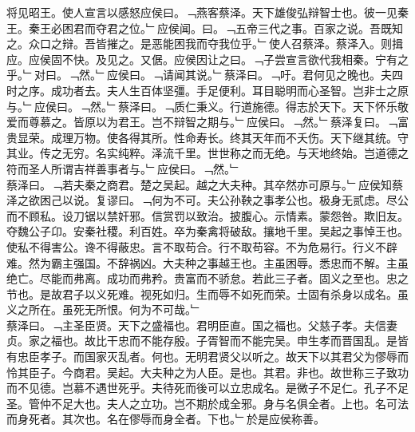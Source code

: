 \documentclass{zhvt-classic}
\begin{document}
\hspace*{2em}将见昭王。使人宣言以感怒应侯曰。﹁燕客蔡泽。天下雄俊弘辩智士也。彼一见秦王。秦王必困君而夺君之位。﹂应侯闻。曰。﹁五帝三代之事。百家之说。吾既知之。众口之辩。吾皆摧之。是恶能困我而夺我位乎。﹂使人召蔡泽。蔡泽入。则揖应。应侯固不快。及见之。又倨。应侯因让之曰。﹁子尝宣言欲代我相秦。宁有之乎。﹂对曰。﹁然。﹂应侯曰。﹁请闻其说。﹂蔡泽曰。﹁吁。君何见之晚也。夫四时之序。成功者去。夫人生百体坚彊。手足便利。耳目聪明而心圣智。岂非士之原与。﹂应侯曰。﹁然。﹂蔡泽曰。﹁质仁秉义。行道施德。得志於天下。天下怀乐敬爱而尊慕之。皆原以为君王。岂不辩智之期与。﹂应侯曰。﹁然。﹂蔡泽复曰。﹁富贵显荣。成理万物。使各得其所。性命寿长。终其天年而不夭伤。天下继其统。守其业。传之无穷。名实纯粹。泽流千里。世世称之而无绝。与天地终始。岂道德之符而圣人所谓吉祥善事者与。﹂应侯曰。﹁然。﹂\\
\hspace*{2em}蔡泽曰。﹁若夫秦之商君。楚之吴起。越之大夫种。其卒然亦可原与。﹂应侯知蔡泽之欲困己以说。复谬曰。﹁何为不可。夫公孙鞅之事孝公也。极身无贰虑。尽公而不顾私。设刀锯以禁奸邪。信赏罚以致治。披腹心。示情素。蒙怨咎。欺旧友。夺魏公子卬。安秦社稷。利百姓。卒为秦禽将破敌。攘地千里。吴起之事悼王也。使私不得害公。谗不得蔽忠。言不取苟合。行不取苟容。不为危易行。行义不辟难。然为霸主强国。不辞祸凶。大夫种之事越王也。主虽困辱。悉忠而不解。主虽绝亡。尽能而弗离。成功而弗矜。贵富而不骄怠。若此三子者。固义之至也。忠之节也。是故君子以义死难。视死如归。生而辱不如死而荣。士固有杀身以成名。虽义之所在。虽死无所恨。何为不可哉。﹂\\
\hspace*{2em}蔡泽曰。﹁主圣臣贤。天下之盛福也。君明臣直。国之福也。父慈子孝。夫信妻贞。家之福也。故比干忠而不能存殷。子胥智而不能完吴。申生孝而晋国乱。是皆有忠臣孝子。而国家灭乱者。何也。无明君贤父以听之。故天下以其君父为僇辱而怜其臣子。今商君。吴起。大夫种之为人臣。是也。其君。非也。故世称三子致功而不见德。岂慕不遇世死乎。夫待死而後可以立忠成名。是微子不足仁。孔子不足圣。管仲不足大也。夫人之立功。岂不期於成全邪。身与名俱全者。上也。名可法而身死者。其次也。名在僇辱而身全者。下也。﹂於是应侯称善。\\
\end{document}
